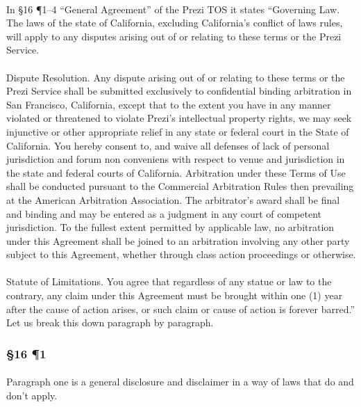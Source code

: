 \paragraph{}
In \S16 \P 1--4 ``General Agreement'' of the Prezi\texttrademark{} TOS it states
``Governing Law. The laws of the state of California, excluding California’s
conflict of laws rules, will apply to any disputes arising out of or relating to
these terms or the Prezi Service.
\\ \\
Dispute Resolution. Any dispute arising out of or relating to these terms or the
Prezi Service shall be submitted exclusively to confidential binding arbitration
in San Francisco, California, except that to the extent you have in any manner
violated or threatened to violate Prezi’s intellectual property rights, we may
seek injunctive or other appropriate relief in any state or federal court in the
State of California. You hereby consent to, and waive all defenses of lack of
personal jurisdiction and forum non conveniens with respect to venue and
jurisdiction in the state and federal courts of California. Arbitration under
these Terms of Use shall be conducted pursuant to the Commercial Arbitration
Rules then prevailing at the American Arbitration Association. The arbitrator’s
award shall be final and binding and may be entered as a judgment in any court
of competent jurisdiction. To the fullest extent permitted by applicable law,
no arbitration under this Agreement shall be joined to an arbitration involving
any other party subject to this Agreement, whether through class action
proceedings or otherwise.
\\ \\
Statute of Limitations. You agree that regardless of any statue or law to the
contrary, any claim under this Agreement must be brought within one (1) year
after the cause of action arises, or such claim or cause of action is forever
barred.'' Let us break this down paragraph by paragraph.
\par
\newpage

\subsubsection{\S16 \P1}
\paragraph{}
Paragraph one is a general disclosure and disclaimer in a way of laws that do
and don't apply.
\par

